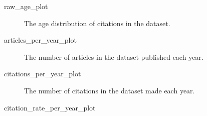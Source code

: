\documentclass[
  10pt,
  letterpaper,
  DIV=11,
  numbers=noendperiod,
  twoside]{scrartcl}
\newenvironment{Shaded}{\begin{snugshade}}{\end{snugshade}}
\newcommand{\NormalTok}[1]{\textcolor[rgb]{0.00,0.23,0.31}{#1}}
\begin{document}
\begin{Shaded}
\begin{Highlighting}[]
\NormalTok{raw\_age\_plot}
\end{Highlighting}
\end{Shaded}

\begin{figure}[H]


\caption{\label{fig-rawage}The age distribution of citations in the
dataset.}

\end{figure}%

\begin{Shaded}
\begin{Highlighting}[]
\NormalTok{articles\_per\_year\_plot}
\end{Highlighting}
\end{Shaded}

\begin{figure}[H]


\caption{\label{fig-articlesperyear}The number of articles in the
dataset published each year.}

\end{figure}%

\begin{Shaded}
\begin{Highlighting}[]
\NormalTok{citations\_per\_year\_plot}
\end{Highlighting}
\end{Shaded}

\begin{figure}[H]


\caption{\label{fig-citationsperyear}The number of citations in the
dataset made each year.}

\end{figure}%

\begin{Shaded}
\begin{Highlighting}[]
\NormalTok{citation\_rate\_per\_year\_plot}
\end{Highlighting}
\end{Shaded}
\end{document}
